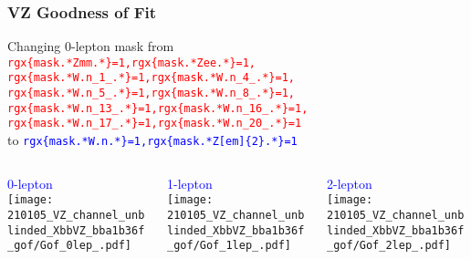 \documentclass{beamer}
\begin{document}
\begin{frame}
  \frametitle{VZ Goodness of Fit}

  Changing 0-lepton mask from \\
  \textcolor{red}{
  \texttt{rgx\{mask.*Zmm.*\}=1,rgx\{mask.*Zee.*\}=1,\\
    rgx\{mask.*W.n\_1\_.*\}=1,rgx\{mask.*W.n\_4\_.*\}=1,\\
    rgx\{mask.*W.n\_5\_.*\}=1,rgx\{mask.*W.n\_8\_.*\}=1,\\
    rgx\{mask.*W.n\_13\_.*\}=1,rgx\{mask.*W.n\_16\_.*\}=1,\\
    rgx\{mask.*W.n\_17\_.*\}=1,rgx\{mask.*W.n\_20\_.*\}=1} \\
  }
  to \textcolor{blue}{\texttt{rgx\{mask.*W.n.*\}=1,rgx\{mask.*Z[em]\{2\}.*\}=1}}

  \begin{columns}
    \begin{column}{0.3\linewidth}
      \centering
      \textcolor{blue}{0-lepton} \\
      \texttt{[image: 210105\_VZ\_channel\_unblinded\_XbbVZ\_bba1b36f\_gof/Gof\_0lep\_.pdf]}
    \end{column}
    \begin{column}{0.3\linewidth}
      \centering
      \textcolor{blue}{1-lepton} \\
      \texttt{[image: 210105\_VZ\_channel\_unblinded\_XbbVZ\_bba1b36f\_gof/Gof\_1lep\_.pdf]}
    \end{column}
    \begin{column}{0.3\linewidth}
      \centering
      \textcolor{blue}{2-lepton} \\
      \texttt{[image: 210105\_VZ\_channel\_unblinded\_XbbVZ\_bba1b36f\_gof/Gof\_2lep\_.pdf]}
    \end{column}
  \end{columns}

\end{frame}
\end{document}
